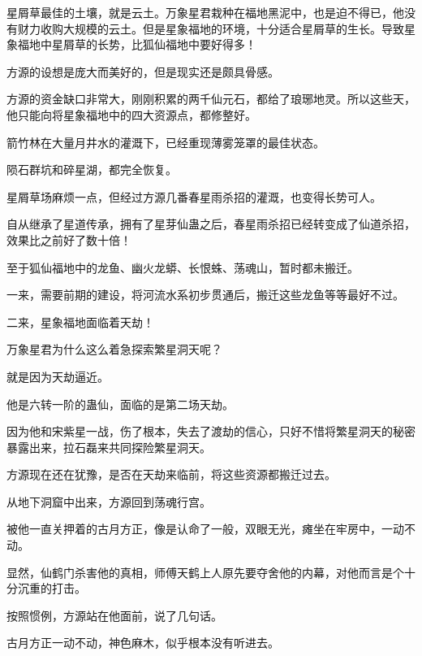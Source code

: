 \begin{this_body}
星屑草最佳的土壤，就是云土。万象星君栽种在福地黑泥中，也是迫不得已，他没有财力收购大规模的云土。但是星象福地的环境，十分适合星屑草的生长。导致星象福地中星屑草的长势，比狐仙福地中要好得多！

方源的设想是庞大而美好的，但是现实还是颇具骨感。

方源的资金缺口非常大，刚刚积累的两千仙元石，都给了琅琊地灵。所以这些天，他只能向将星象福地中的四大资源点，都修整好。

箭竹林在大量月井水的灌溉下，已经重现薄雾笼罩的最佳状态。

陨石群坑和碎星湖，都完全恢复。

星屑草场麻烦一点，但经过方源几番春星雨杀招的灌溉，也变得长势可人。

自从继承了星道传承，拥有了星芽仙蛊之后，春星雨杀招已经转变成了仙道杀招，效果比之前好了数十倍！

至于狐仙福地中的龙鱼、幽火龙蟒、长恨蛛、荡魂山，暂时都未搬迁。

一来，需要前期的建设，将河流水系初步贯通后，搬迁这些龙鱼等等最好不过。

二来，星象福地面临着天劫！

万象星君为什么这么着急探索繁星洞天呢？

就是因为天劫逼近。

他是六转一阶的蛊仙，面临的是第二场天劫。

因为他和宋紫星一战，伤了根本，失去了渡劫的信心，只好不惜将繁星洞天的秘密暴露出来，拉石磊来共同探险繁星洞天。

方源现在还在犹豫，是否在天劫来临前，将这些资源都搬迁过去。

从地下洞窟中出来，方源回到荡魂行宫。

被他一直关押着的古月方正，像是认命了一般，双眼无光，瘫坐在牢房中，一动不动。

显然，仙鹤门杀害他的真相，师傅天鹤上人原先要夺舍他的内幕，对他而言是个十分沉重的打击。

按照惯例，方源站在他面前，说了几句话。

古月方正一动不动，神色麻木，似乎根本没有听进去。

\end{this_body}

